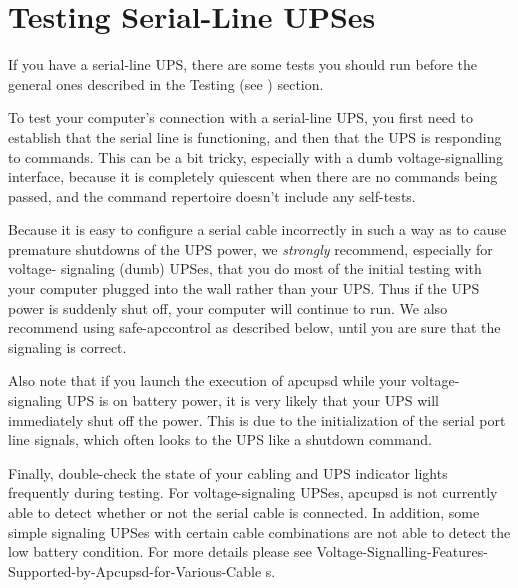 {{{{{{{{{

\label{Testing-Serial_002dLine-UPSes}
\section*{Testing Serial-Line UPSes}

\label{index-Testing_002c-Serial-219}
\label{index-Serial_002c-Testing-220}
If you have a serial-line UPS, there are some tests you should run before the
general ones described in the Testing (see 
) section.  

To test your computer's connection with a serial-line UPS, you first need to
establish that the serial line is functioning, and then that the UPS is
responding to commands.  This can be a bit tricky, especially with a dumb
voltage-signalling interface, because it is completely quiescent when there
are no commands being passed, and the command repertoire doesn't include any
self-tests.  

Because it is easy to configure a serial cable incorrectly in such a way as to
cause premature shutdowns of the UPS power, we {\it strongly} recommend,
especially for voltage- signaling (dumb) UPSes, that you do most of the
initial testing with your computer plugged into the wall rather than your UPS.
Thus if the UPS power is suddenly shut off, your computer will continue to
run. We also recommend using safe-apccontrol as described below, until you are
sure that the signaling is correct.  

Also note that if you launch the execution of apcupsd while your
voltage-signaling UPS is on battery power, it is very likely that your UPS
will immediately shut off the power. This is due to the initialization of the
serial port line signals, which often looks to the UPS like a shutdown
command.  

Finally, double-check the state of your cabling and UPS indicator lights
frequently during testing.  For voltage-signaling UPSes, apcupsd is not
currently able to detect whether or not the serial cable is connected. In
addition, some simple signaling UPSes with certain cable combinations are not
able to detect the low battery condition.  For more details please see 
{Voltage-Signalling-Features-Supported-by-Apcupsd-for-Various-Cable%
s}. 

}}}}}}}}}
